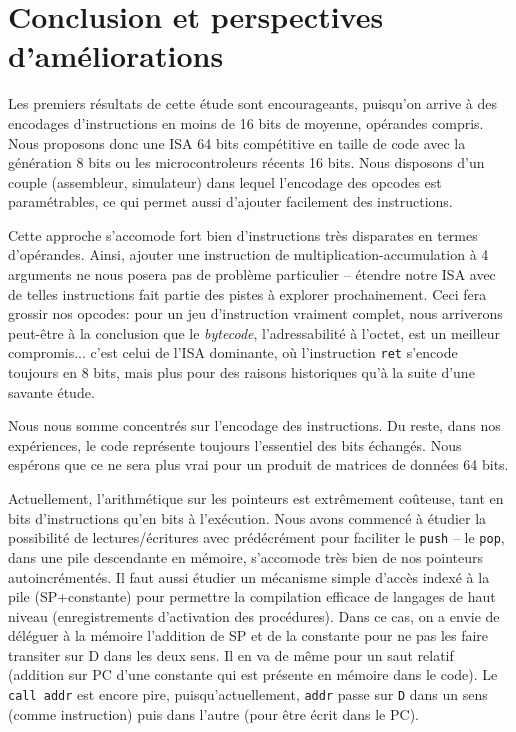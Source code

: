 \documentclass[architecture]{compas2018}
\begin{document}
\section{Conclusion et perspectives d'améliorations}

Les premiers résultats de cette étude sont encourageants, puisqu'on arrive à des encodages d'instructions en moins de 16 bits de moyenne, opérandes compris.
Nous proposons donc une ISA 64 bits compétitive en taille de code avec la génération 8 bits ou les microcontroleurs récents 16 bits.
Nous disposons d'un couple (assembleur, simulateur) dans lequel l'encodage des opcodes est paramétrables, ce qui permet aussi d'ajouter facilement des instructions.



Cette approche s'accomode fort bien d'instructions très disparates en termes d'opérandes.
Ainsi, ajouter une instruction de multiplication-accumulation à 4 arguments ne nous posera pas de problème particulier -- étendre notre ISA avec de telles instructions fait partie des pistes à explorer prochainement.
Ceci fera grossir nos opcodes: pour un jeu d'instruction vraiment complet, nous arriverons peut-être à la conclusion que le \emph{bytecode}, l'adressabilité à l'octet, est un meilleur compromis... c'est celui de l'ISA dominante, où l'instruction \texttt{ret} s'encode toujours en 8 bits, mais plus pour des raisons historiques qu'à la suite d'une savante étude.

Nous nous somme concentrés sur l'encodage des instructions.
Du reste, dans nos expériences, le code représente toujours l'essentiel des bits échangés.
Nous espérons que ce ne sera plus vrai pour un produit de matrices de données 64 bits.

Actuellement, l'arithmétique sur les pointeurs est extrêmement coûteuse, tant en bits d'instructions qu'en bits à l'exécution.
Nous avons commencé à étudier la possibilité de lectures/écritures avec prédécrément pour faciliter le \texttt{push} -- le \texttt{pop}, dans une pile descendante en mémoire, s'accomode très bien de nos pointeurs autoincrémentés.
Il faut aussi étudier un mécanisme simple  d'accès indexé à la pile (SP+constante) pour permettre la compilation efficace de langages de haut niveau (enregistrements d'activation des procédures).
Dans ce cas, on a envie de déléguer à la mémoire l'addition de SP et de la constante pour ne pas les faire transiter sur D dans les deux sens.
Il en va de même pour un saut relatif (addition sur PC d'une constante qui est présente en mémoire dans le code).
Le  \texttt{call addr} est encore pire, puisqu'actuellement, \texttt{addr} passe sur \texttt{D} dans un sens (comme instruction) puis dans l'autre (pour être écrit dans le PC).
\end{document}
